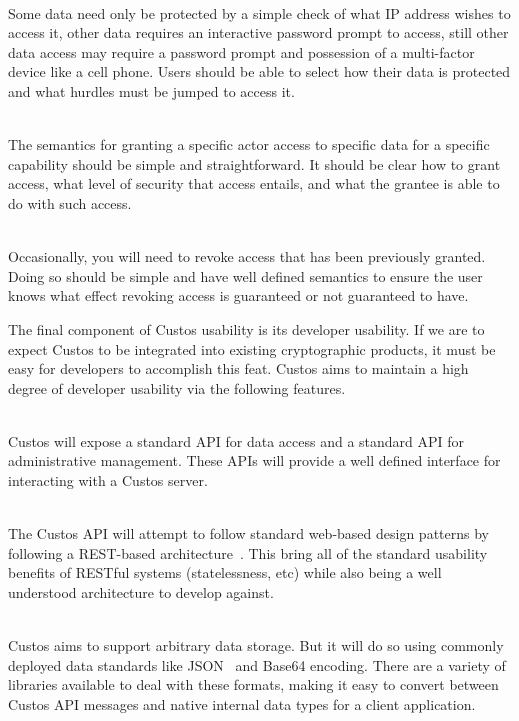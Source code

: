 \begin{packed_desc}
\item[Flexible Authentication Mechanisms] \hfill \\ Some data need
  only be protected by a simple check of what IP address wishes to
  access it, other data requires an interactive password prompt to
  access, still other data access may require a password prompt and
  possession of a multi-factor device like a cell phone. Users should
  be able to select how their data is protected and what hurdles must
  be jumped to access it.
\item[Simple Access Granting] \hfill \\ The semantics for granting a
  specific actor access to specific data for a specific capability
  should be simple and straightforward. It should be clear how to
  grant access, what level of security that access entails, and what
  the grantee is able to do with such access.
\item[Simple Access Revocation] \hfill \\ Occasionally, you will need
  to revoke access that has been previously granted. Doing so should
  be simple and have well defined semantics to ensure the user knows
  what effect revoking access is guaranteed or not guaranteed to have.
\end{packed_desc}

The final component of Custos usability is its developer usability. If
we are to expect Custos to be integrated into existing cryptographic
products, it must be easy for developers to accomplish this
feat. Custos aims to maintain a high degree of developer usability via
the following features.

\begin{packed_desc}
\item[Well Defined API] \hfill \\ Custos will expose a standard API
  for data access and a standard API for administrative
  management. These APIs will provide a well defined interface for
  interacting with a Custos server.
\item[Standard Design Patterns] \hfill \\ The Custos API will attempt
  to follow standard web-based design patterns by following a
  REST-based architecture~\cite{ibm-restful}. This bring all of the
  standard usability benefits of RESTful systems (statelessness, etc)
  while also being a well understood architecture to develop against.
\item[Standard Data Formats] \hfill \\ Custos aims to support
  arbitrary data storage. But it will do so using commonly deployed
  data standards like JSON~\cite{json} and Base64 encoding. There are
  a variety of libraries available to deal with these formats, making
  it easy to convert between Custos API messages and native internal
  data types for a client application.
\end{packed_desc}

